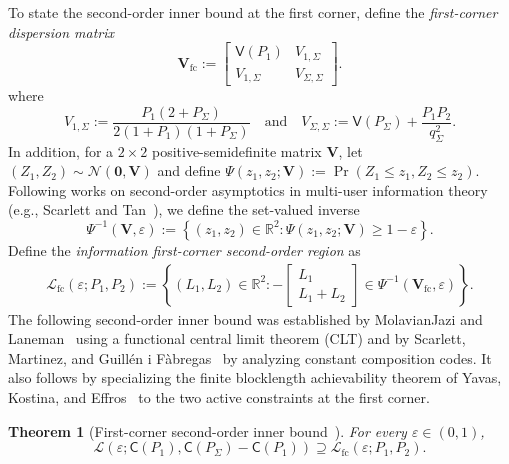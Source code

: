\documentclass[11pt,onecolumn]{IEEEtran}
\newcommand{\calL}{\mathcal{L}}
\newcommand{\calN}{\mathcal{N}}
\newcommand{\bV}{\mathbf{V}}
\newcommand{\bbR}{\mathbb{R}}
\newcommand{\rvC}{\mathsf{C}}
\newcommand{\rvV}{\mathsf{V}}
\newcommand{\eps}{\varepsilon}
\newcommand{\bzero}{\mathbf{0}}
\newtheorem{theorem}{Theorem}
\begin{document}
To state the second-order inner bound at the first corner, define the
{\em first-corner  dispersion matrix}
\begin{equation}
\bV_{\mathrm{fc}}
:=
\begin{bmatrix}
\rvV(P_1) & V_{1,\Sigma}\\
V_{1,\Sigma} & V_{\Sigma,\Sigma}
\end{bmatrix}. \label{eqn:defVfc}
\end{equation} 
where 
\begin{equation}
V_{1,\Sigma} := \frac{P_1(2+P_\Sigma)}{2(1+P_1)(1+P_\Sigma)}\quad\mbox{and}\quad V_{\Sigma,\Sigma}:=\rvV(P_\Sigma)+\frac{P_1P_2}{q_\Sigma^2}.
\end{equation}
In addition, for a $2\times 2$ positive-semidefinite matrix $\bV$, let $(Z_1, Z_2)\sim\calN(\bzero,\bV)$ and define $\Psi(z_1, z_2; \bV):=\Pr(Z_1\le z_1, Z_2 \le z_2)$. Following works on second-order asymptotics in multi-user information theory (e.g., Scarlett and Tan~\cite{ST2015}), we define the set-valued inverse 
\begin{equation}
\Psi^{-1}(\bV,\eps):=\left\{ (z_1, z_2) \in\bbR^2: \Psi(z_1,z_2;\bV)\ge 1-\eps\right\}.
\end{equation}
Define the {\em  information  first-corner second-order  region} as
\begin{align}
    \calL_{\mathrm{fc}}(\eps;P_1, P_2):=\left\{(L_1, L_2)\in\bbR^2: -\begin{bmatrix}
L_1\\ L_1+L_2
\end{bmatrix} \in\Psi^{-1}(\bV_{\mathrm{fc}},\eps) \right\}. \label{eqn:inf_fc}
\end{align}
The following second-order inner bound was established  by MolavianJazi
and Laneman~\cite{MolavianJaziLaneman2015} using a functional central limit theorem (CLT) and by Scarlett, Martinez,
and Guill\'en i F\`abregas~\cite{ScarlettMartinezGuillen2015} by analyzing constant composition codes. It also
follows by specializing the finite blocklength achievability theorem of
Yavas, Kostina, and Effros~\cite{yavas21} to the two active constraints
at the first corner.
\begin{theorem}[First-corner second-order inner bound~\cite{MolavianJaziLaneman2015, ScarlettMartinezGuillen2015, yavas21}] \label{thm:yke}
For every $\eps\in (0,1)$, %
\begin{equation}
\calL(\eps; \rvC(P_1),  \rvC(P_\Sigma)-\rvC(P_1))\supseteq \calL_{\mathrm{fc}}(\eps;P_1, P_2).
\end{equation}
\end{theorem}
\end{document}
